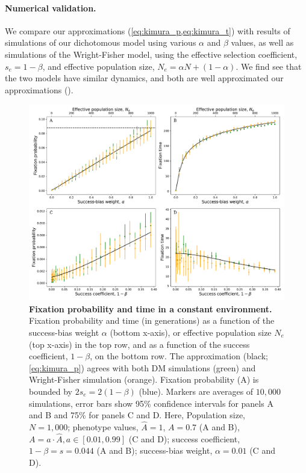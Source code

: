 \documentclass[12pt]{extarticle}
\begin{document}
\paragraph{Numerical validation.}
We compare our approximations (\cref{eq:kimura_p,eq:kimura_t}) with results of simulations of our dichotomous model using various $\alpha$ and $\beta$ values, as well as simulations of the Wright-Fisher model, using the effective selection coefficient, $s_e=1-\beta$, and effective population size, $N_e=\alpha N + (1-\alpha)$. 
We find see that the two models have similar dynamics, and both are well approximated our approximations ().


\begin{figure}[h]
    \includegraphics[width=\linewidth]{../figures/final/kimura_var.pdf}
  \caption{\textbf{Fixation probability and time in a constant environment.}
  Fixation probability and time (in generations) as a function of the success-bias weight $\alpha$ (bottom x-axis), or effective population size $N_e$ (top x-axis) in the top row, and as a function of the success coefficient, $1-\beta$, on the bottom row.
  The approximation (black; \cref{eq:kimura_p}) agrees with both DM simulations (green) and Wright-Fisher simulation (orange).
  Fixation probability (A) is bounded by $2s_e=2(1-\beta)$ (blue).
  Markers are averages of $10,000$ simulations, error bars show 95\% confidence intervals for panels A and B and 75\% for panels C and D.
   Here, Population size, $N=1,000$; phenotype values, $\hat{A}=1$, $A=0.7$ (A and B), $A=a\cdot \hat{A}, a \in [0.01,0.99]$ (C and D); success coefficient, $1-\beta=s=0.044$ (A and B); success-bias weight, $\alpha=0.01$ (C and D).}
  \label{fig:var_alpha}
\end{figure}
\end{document}
